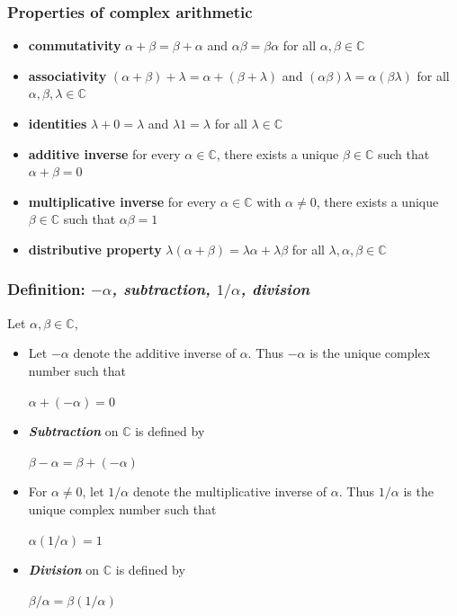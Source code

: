 \documentclass{report}
\begin{document}
\subsubsection{Properties of complex arithmetic}
\begin{itemize}
	\item \textbf{commutativity}\newline
		$\alpha + \beta = \beta + \alpha$ and $\alpha\beta = \beta\alpha$ for all $\alpha, \beta \in \mathbb{C}$    
    \item \textbf{associativity}\newline
    	$(\alpha + \beta) + \lambda = \alpha + (\beta + \lambda)$ and $(\alpha\beta)\lambda=\alpha(\beta\lambda)$ for all $\alpha,\beta,\lambda \in \mathbb{C}$
    \item \textbf{identities}\newline
    	$\lambda + 0=\lambda$ and $\lambda1=\lambda$ for all $\lambda \in \mathbb{C}$
    \item \textbf{additive inverse}\newline
    	for every $\alpha \in \mathbb{C}$, there exists a unique $\beta \in \mathbb{C}$ such that $\alpha + \beta = 0$
    \item \textbf{multiplicative inverse}\newline
    	for every $\alpha \in \mathbb{C}$ with $\alpha \neq 0$, there exists a unique $\beta \in \mathbb{C}$ such that $\alpha\beta=1$
    \item \textbf{distributive property}\newline
    	$\lambda(\alpha + \beta) = \lambda \alpha + \lambda \beta$ for all $\lambda, \alpha, \beta \in \mathbb{C}$
\end{itemize}

\subsubsection{Definition: \textbf{\textit{$-\alpha$, subtraction, $1/\alpha$, division}}}
Let $\alpha, \beta \in \mathbb{C}$,\newline
\begin{itemize}
	\item Let $-\alpha$ denote the additive inverse of $\alpha$. Thus $-\alpha$ is the unique complex number such that\newline
    	\centerline{$\alpha + (-\alpha)=0$}
   	\item \textbf{\textit{Subtraction}} on $\mathbb{C}$ is defined by\newline
    	\centerline{$\beta-\alpha=\beta+(-\alpha)$}
    \item For $\alpha \neq 0$, let $1 / \alpha$ denote the multiplicative inverse of $\alpha$. Thus $1/\alpha$ is the unique complex number such that\newline
    	\centerline{$\alpha(1/\alpha)=1$}
    \item \textbf{\textit{Division}} on $\mathbb{C}$ is defined by\newline
    	\centerline{$\beta/\alpha=\beta(1/\alpha)$}
\end{itemize}
\end{document}
